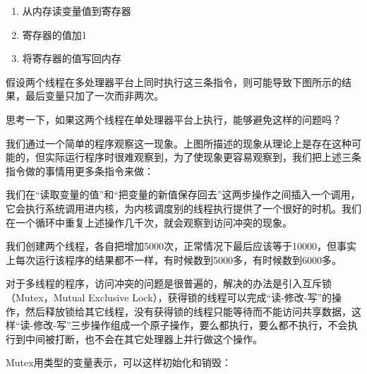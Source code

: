 \begin{enumerate}

\item 从内存读变量值到寄存器

\item 寄存器的值加1

\item 将寄存器的值写回内存
\end{enumerate}


假设两个线程在多处理器平台上同时执行这三条指令，则可能导致下图所示的结果，最后变量只加了一次而非两次。




思考一下，如果这两个线程在单处理器平台上执行，能够避免这样的问题吗？



我们通过一个简单的程序观察这一现象。上图所描述的现象从理论上是存在这种可能的，但实际运行程序时很难观察到，为了使现象更容易观察到，我们把上述三条指令做的事情用更多条指令来做：




我们在“读取变量的值”和“把变量的新值保存回去”这两步操作之间插入一个调用，它会执行系统调用进内核，为内核调度别的线程执行提供了一个很好的时机。我们在一个循环中重复上述操作几千次，就会观察到访问冲突的现象。




我们创建两个线程，各自把增加5000次，正常情况下最后应该等于10000，但事实上每次运行该程序的结果都不一样，有时候数到5000多，有时候数到6000多。




对于多线程的程序，访问冲突的问题是很普遍的，解决的办法是引入互斥锁（Mutex，Mutual Exclusive Lock），获得锁的线程可以完成“读-修改-写”的操作，然后释放锁给其它线程，没有获得锁的线程只能等待而不能访问共享数据，这样“读-修改-写”三步操作组成一个原子操作，要么都执行，要么都不执行，不会执行到中间被打断，也不会在其它处理器上并行做这个操作。



Mutex用类型的变量表示，可以这样初始化和销毁：




